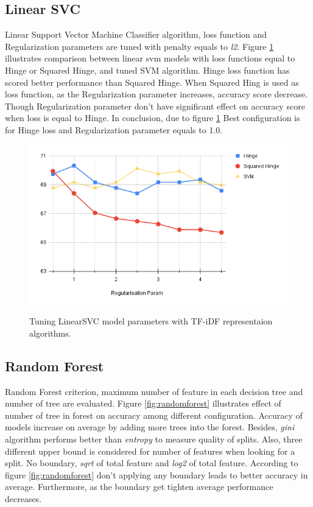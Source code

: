\subsection{Linear SVC}
Linear Support Vector Machine Classifier algorithm, loss function and Regularization parameters are tuned with penalty equals to \textit{l2}. Figure \ref{fig:linearsvm} illustrates comparison between linear svm models with loss functions equal to Hinge or Squared Hinge, and tuned SVM algorithm. Hinge loss function has scored better performance than Squared Hinge. When Squared Hing is used as loss function, as the Regularization parameter increases, accuracy score decrease. Though Regularization parameter don't have significant effect on accuracy score when loss is equal to Hinge. In conclusion, due to figure \ref{fig:linearsvm} Best configuration is for Hinge loss and Regularization parameter equals to 1.0. 
\begin{figure}%
	\centering
	{\includegraphics[width=12.5cm]{statistics/linearsvm.png} }
	\caption{Tuning LinearSVC model parameters with TF-iDF representaion algorithms.}%
	\label{fig:linearsvm}%
\end{figure}
\subsection{Random Forest}
Random Forest criterion, maximum number of feature in each decision tree and number of tree are evaluated. Figure \ref{fig:randomforest} illustrates effect of number of tree in forest on accuracy among different configuration. Accuracy of models increase on average by adding more trees into the forest. Besides, \textit{gini} algorithm performs better than \textit{entropy} to measure quality of splits. Also, three different upper bound is considered for number of features when looking for a split. No boundary, \textit{sqrt} of total feature and \textit{log2} of total feature. According to figure \ref{fig:randomforest} don't applying any boundary leads to better accuracy in average. Furthermore, as the boundary get tighten average performance decreases. 


